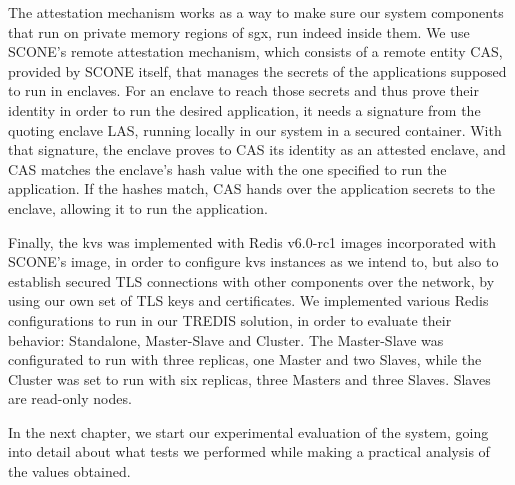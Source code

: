 The attestation mechanism works as a way to make sure our system components that run on private memory regions of \gls{sgx}, run indeed inside them. We use SCONE's remote attestation mechanism, which consists of a remote entity CAS, provided by SCONE itself, that manages the secrets of the applications supposed to run in enclaves. For an enclave to reach those secrets and thus prove their identity in order to run the desired application, it needs a signature from the quoting enclave LAS, running locally in our system in a secured container. With that signature, the enclave proves to CAS its identity as an attested enclave, and CAS matches the enclave's hash value with the one specified to run the application. If the hashes match, CAS hands over the application secrets to the enclave, allowing it to run the application.

Finally, the \gls{kvs} was implemented with Redis v6.0-rc1 images incorporated with SCONE's image, in order to configure \gls{kvs} instances as we intend to, but also to establish secured TLS connections with other components over the network, by using our own set of TLS keys and certificates. We implemented various Redis configurations to run in our TREDIS solution, in order to evaluate their behavior: Standalone, Master-Slave and Cluster. The Master-Slave was configurated to run with three replicas, one Master and two Slaves, while the Cluster was set to run with six replicas, three Masters and three Slaves. Slaves are read-only nodes.

In the next chapter, we start our experimental evaluation of the system, going into detail about what tests we performed while making a practical analysis of the values obtained.





